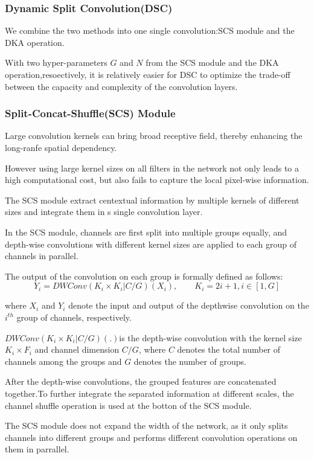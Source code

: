 \documentclass[11pt]{article}
\begin{document}
\subsubsection{Dynamic Split Convolution(DSC)}
We combine the two methods into one single convolution:SCS module and the DKA operation.

With two hyper-parameters $G$ and $N$ from the SCS module and the DKA operation,resoectively, it is relatively easier for DSC to optimize the trade-off between the capacity and complexity of the convolution layers.

\subsubsection{Split-Concat-Shuffle(SCS) Module}
Large convolution kernels can bring broad receptive field, thereby enhancing the long-ranfe spatial dependency.

However using large kernel sizes on all filters in the network not only leads to a high computational cost, but also fails to capture the local pixel-wise information.

The SCS module extract centextual information by multiple kernels of different sizes and integrate them in s single convolution layer.

In the SCS module, channels are first split into multiple groups equally, and depth-wise convolutions with different kernel sizes are applied to each group of channels in parallel.

The output of the convolution on each group is formally defined as follows:
$$Y_i = DWConv(K_i\times K_i|C/G)(X_i),\qquad K_i=2i+1, i\in [1, G]$$

where $X_i$ and $Y_i$ denote the input and output of the depthwise convolution on the $i^{th}$ group of channels, respectively.

$DWConv(K_i\times K_i|C/G)(.)$is the depth-wise convolution with the kernel size $K_i\times F_i$ and channel dimension $C/G$, where $C$ denotes the total number of channels among the groups and $G$ denotes the number of groups.

After the depth-wise convolutions, the grouped features are concatenated together.To further integrate the separated information at different scales, the channel shuffle operation is used at the botton of the SCS module.

The SCS module does not expand the width of the network, as it only splits channels into different groups and performs different convolution operations on them in parrallel.
\end{document}
